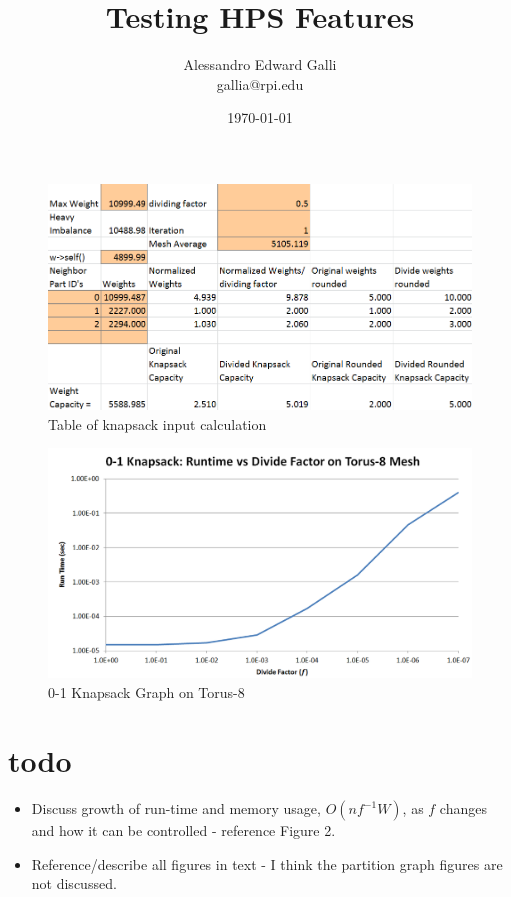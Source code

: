 \documentclass[a4paper]{article}
\title{Testing HPS Features}
\author{Alessandro Edward Galli\\gallia@rpi.edu}
\date{\today}
\begin{document}
\maketitle

\begin{figure}
  \centering
  \includegraphics[width=1\textwidth]{knapsack.PNG}
  \caption{\label{fig:knapsacktable}Table of knapsack input calculation}
\end{figure} 

\begin{figure}
  \centering
  \includegraphics[width=1\textwidth]{Knapsack_Runtime_graph.PNG}
  \caption{\label{fig:knapruntime}0-1 Knapsack Graph on Torus-8}
\end{figure} 

\section{todo}

\begin{itemize}
\item Discuss growth of run-time and memory usage, $O(nf^{-1}W)$, as $f$ changes and how it can be controlled - reference Figure 2.
\item Reference/describe all figures in text - I think the partition graph figures are not discussed.
\end{itemize}
\end{document}
